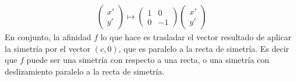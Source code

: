 \documentclass[14pt]{book}
\begin{document}
\begin{align*}
	\left(\begin{array}{c}
	x' \\ y'
	\end{array}\right) \mapsto 
	\left(\begin{array}{cc}
	1 & 0 \\ 0 & -1
	\end{array}\right)\left(\begin{array}{c}
	x' \\ y'
	\end{array}\right)
\end{align*}
En conjunto, la afinidad $f$ lo que hace es trasladar el vector resultado de aplicar la simetría por el vector $(c, 0)$, que es paralelo a la recta de simetría. Es decir que $f$ puede ser una simetría con respecto a una recta, o una simetría con deslizamiento paralelo a la recta de simetría.
\end{document}
